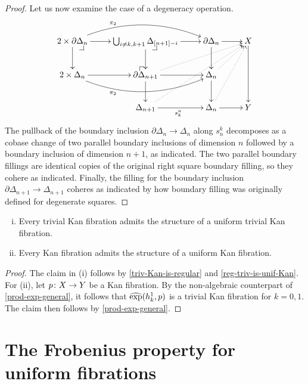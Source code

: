 \documentclass[reqno,10pt,a4paper,oneside]{amsart}
\begin{document}
\begin{proof}
Let us now examine the case of a degeneracy operation.
\[
\xymatrix{
  2 \times \partial \Delta_n
  \ar[r]
  \ar[d]
  \ar@/^2em/[rr]^(0.3){\pi_2}
  \pullback{dr}
&
  \bigcup_{i \neq k, k+1} \Delta_{[n+1] - i}
  \ar[r]
  \ar[d]
  \pullback{dr}
&
  \partial \Delta_n
  \ar[d]
  \ar[r]
&
  X
  \ar[dd]
\\
  2 \times \Delta_n
  \ar[r]
  \ar@/_2em/[rr]_(0.3){\pi_2}
&
  \partial \Delta_{n+1}
  \ar[r]
  \ar[d]
  \ar@{.>}[urr]
  \pullback{ul}
&
  \Delta_n
  \ar[d]
  \ar@{.>}[ur]
\\&
  \Delta_{n+1}
  \ar[r]_{s_k^n}
  \ar@{.>}[uurr]
&
  \Delta_n
  \ar[r]
  \ar@{.>}[uur]
&
  Y
}
\]
The pullback of the boundary inclusion $\partial \Delta_n \to \Delta_n$ along $s^k_n$ decomposes as a cobase change of two parallel boundary inclusions of dimension $n$ followed by a boundary inclusion of dimension $n+1$,
as indicated.
The two parallel boundary fillings are identical copies of the original right square boundary filling, so they cohere as indicated.
Finally, the filling for the boundary inclusion~$\partial \Delta_{n+1} \to \Delta_{n+1}$ coheres as indicated by how boundary filling was originally defined for degenerate squares.
\end{proof}











\begin{theorem}[ZFC]  \hfill 
\begin{enumerate}[(i)]
\item  Every trivial Kan fibration admits the structure of a uniform trivial Kan fibration.
\item Every Kan fibration admits the structure of a uniform  Kan fibration.
\end{enumerate} 
\end{theorem}

\begin{proof} The claim in (i) follows by \cref{triv-Kan-is-regular}  and \cref{reg-triv-is-unif-Kan}. For (ii), let
$p \colon X \to Y$ be a Kan fibration. By the non-algebraic counterpart of \cref{prod-exp-general}, it follows 
that $\operatorname{\widehat{exp}}(h_k^1, p)$ is a trivial Kan fibration for $k = 0, 1$. The claim then follows  by \cref{prod-exp-general}. 
\end{proof}




\section{The Frobenius property for uniform fibrations} 
\label{sec:frobenius-uniform-fibration}
\end{document}
